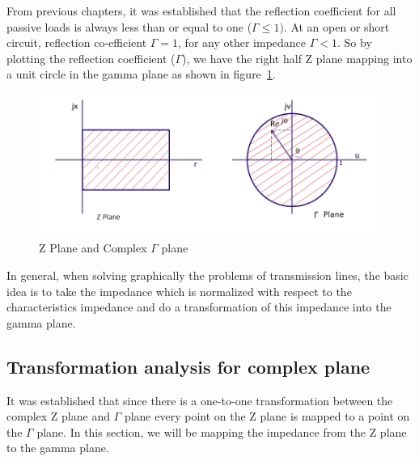From previous chapters, it was established that the reflection coefficient for all passive loads is always less than or equal to one ($\Gamma\leq 1)$. At an open or short circuit, reflection co-efficient $\Gamma = 1$, for any other impedance $\Gamma < 1$. So by plotting the reflection coefficient ($\Gamma$), we have the right half Z plane mapping into a unit circle in the gamma plane as shown in figure~\ref{fig:oiuhgvcx}.
\begin{figure}[h]
\centering
\includegraphics[width=1.05\linewidth]{./graphics/plane_transform}
\caption{Z Plane and Complex $\Gamma$ plane}
\label{fig:oiuhgvcx}
\end{figure}

In general, when solving graphically the problems of transmission lines, the basic idea is to take the impedance which is normalized with respect to the characteristics impedance and do a transformation of this impedance into the gamma plane.

\subsection{Transformation analysis for complex plane}
It was established that since there is a one-to-one transformation between the complex Z plane and $\Gamma$ plane every point on the Z plane is mapped to a point on the $ \Gamma$ plane. In this section, we will be mapping the impedance from the Z plane to the gamma plane.

